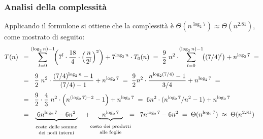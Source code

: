 \subsubsection*{Analisi della complessità}
Applicando il formulone si ottiene che la complessità è \(\Theta(n^{\log_2 7}) \approx \Theta(n^{2.81})\), come mostrato di seguito:
\begin{align*}
	T(n) \;\; &= \sum_{l=0}^{(\log_2 n) - 1} \!\! \left( 7^l \cdot \frac{18}{4} \cdot \left( \frac{n}{2^l} \right)^2 \right) + 7^{\log_2 n} \cdot T_0(n) \; = \; \frac{9}{2} \; n^2 \cdot \! \sum_{l=0}^{(\log_2 n) - 1} \!\! \left( (7/4)^l \right) + n^{\log_2 7} \; = \\[3pt]
	&= \;\; \frac{9}{2} \; n^2 \cdot \frac{(7/4)^{\log_2 n} - 1}{(7/4) - 1} + n^{\log_2 7} \; = \; \frac{9}{2} n^2 \cdot \frac{n^{\log_2 (7/4)} - 1}{3/4} + n^{\log_2 7} \; = \\[3pt]
	&= \;\; \frac{9}{2} \cdot \frac{4}{3} \; n^2 \cdot \left( n^{(\log_2 7) - 2} - 1 \right) + n^{\log_2 7} \; = \; 6 n^2 \cdot (n^{\log_2 7}/n^2 - 1) + n^{\log_2 7} \\[3pt]
	&= \; \underbrace{\; 6 n^{\log_2 7} - 6n^2 \;}_{\begin{array}{c} \text{\scriptsize costo delle somme} \\[-3pt] \text{\scriptsize dei nodi interni} \end{array}}
	\;\; + \!\!\!\! \underbrace{\;\; n^{\log_2 7} \;\;}_{\begin{array}{c} \text{\scriptsize costo dei prodotti} \\[-3pt] \text{\scriptsize alle foglie} \end{array}}
	\!\!\!\!\!\! = \;\; 7n^{\log_2 7} - 6n^2 \; = \; \Theta(n^{\log_2 7}) \; \approx \; \Theta(n^{2.81})
\end{align*}

